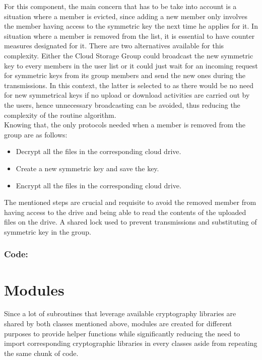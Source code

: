 \documentclass[12pt]{article}
\begin{document}
For this component, the main concern that has to be take into account is a situation where a member is evicted, since adding a new member only involves the member having access to the symmetric key the next time he applies for it. In situation where a member is removed from the list, it is essential to have counter measures designated for it. There are two alternatives available for this complexity. Either the Cloud Storage Group could broadcast the new symmetric key to every members in the user list or it could just wait for an incoming request for symmetric keys from its group members and send the new ones during the transmissions. In this context, the latter is selected to as there would be no need for new symmetrical keys if no upload or download activities are carried out by the users, hence unnecessary broadcasting can be avoided, thus reducing the complexity of the routine algorithm. \\

Knowing that, the only protocols needed when a member is removed from the group are as follows:
\begin{itemize}
\item Decrypt all the files in the corresponding cloud drive.
\item Create a new symmetric key and save the key.
\item Encrypt all the files in the corresponding cloud drive.
\end{itemize}
The mentioned steps are crucial and requisite to avoid the removed member from having access to the drive and being able to read the contents of the uploaded files on the drive. A shared lock used to prevent transmissions and substituting of symmetric key in the group.
\vspace*{10mm}
\subsubsection*{Code:}

\newpage
\section*{Modules}
Since a lot of subroutines that leverage available cryptography libraries are shared by both classes mentioned above, modules are created for different purposes to provide helper functions while significantly reducing the need to import corresponding cryptographic libraries in every classes aside from repeating the same chunk of code. \\
\end{document}
